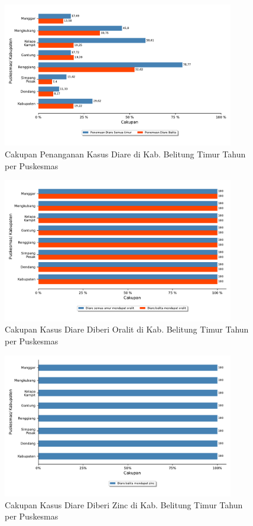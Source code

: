 \begin{figure}[H]
    \centering{}
    \includegraphics[width=0.9\textwidth]{bab_06/bab_06_04a_diareDilayani}
    \caption{Cakupan Penanganan Kasus Diare di Kab. Belitung Timur Tahun \tP per Puskesmas}
    \label{fig:Cakupan-Kasus-Diare-Dilayani}
\end{figure}

\begin{figure}[H]
	\centering{}
	\includegraphics[width=0.9\textwidth]{bab_06/bab_06_04b_diareOralit}
	\caption{Cakupan Kasus Diare Diberi Oralit di Kab. Belitung Timur Tahun \tP per Puskesmas}
	\label{fig:Cakupan-Kasus-Diare-Oralit}
\end{figure}

\begin{figure}[H]
	\centering{}
	\includegraphics[width=0.9\textwidth]{bab_06/bab_06_04c_diareZinc}
	\caption{Cakupan Kasus Diare Diberi Zinc di Kab. Belitung Timur Tahun \tP per Puskesmas}
	\label{fig:Cakupan-Kasus-Diare-Zinc}
\end{figure}

